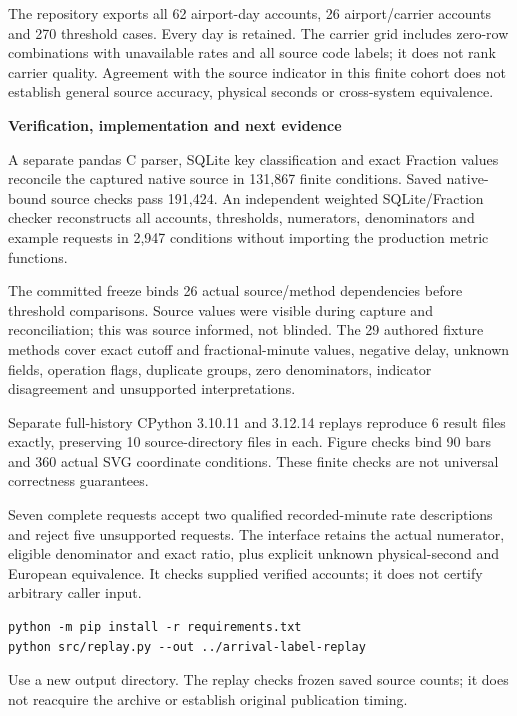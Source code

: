 \documentclass[11pt,letterpaper]{article}
\newcommand{\heading}[1]{\vspace{4pt}{\large\bfseries #1}\par}
\newcommand{\BoundAX}{62}
\newcommand{\BoundAY}{26}
\newcommand{\BoundAZ}{270}
\newcommand{\BoundBA}{131,867}
\newcommand{\BoundBB}{191,424}
\newcommand{\BoundBC}{2,947}
\newcommand{\BoundBD}{26}
\newcommand{\BoundBE}{29}
\newcommand{\BoundBF}{3.10.11}
\newcommand{\BoundBG}{3.12.14}
\newcommand{\BoundBH}{6}
\newcommand{\BoundBI}{10}
\newcommand{\BoundBJ}{90}
\newcommand{\BoundBK}{360}
\begin{document}
\heading{Complete case retention}
The repository exports all \BoundAX{} airport-day accounts, \BoundAY{} airport/carrier accounts and \BoundAZ{} threshold cases. Every day is retained. The carrier grid includes zero-row combinations with unavailable rates and all source code labels; it does not rank carrier quality. Agreement with the source indicator in this finite cohort does not establish general source accuracy, physical seconds or cross-system equivalence.
\newpage
{\Large\bfseries Verification, implementation and next evidence\par}

\heading{Independent evidence}
A separate pandas C parser, SQLite key classification and exact Fraction values reconcile the captured native source in \BoundBA{} finite conditions. Saved native-bound source checks pass \BoundBB{}. An independent weighted SQLite/Fraction checker reconstructs all accounts, thresholds, numerators, denominators and example requests in \BoundBC{} conditions without importing the production metric functions.

The committed freeze binds \BoundBD{} actual source/method dependencies before threshold comparisons. Source values were visible during capture and reconciliation; this was source informed, not blinded. The \BoundBE{} authored fixture methods cover exact cutoff and fractional-minute values, negative delay, unknown fields, operation flags, duplicate groups, zero denominators, indicator disagreement and unsupported interpretations.

Separate full-history CPython \BoundBF{} and \BoundBG{} replays reproduce \BoundBH{} result files exactly, preserving \BoundBI{} source-directory files in each. Figure checks bind \BoundBJ{} bars and \BoundBK{} actual SVG coordinate conditions. These finite checks are not universal correctness guarantees.

\heading{Runnable implementation exercise}
Seven complete requests accept two qualified recorded-minute rate descriptions and reject five unsupported requests. The interface retains the actual numerator, eligible denominator and exact ratio, plus explicit unknown physical-second and European equivalence. It checks supplied verified accounts; it does not certify arbitrary caller input.

\begin{verbatim}
python -m pip install -r requirements.txt
python src/replay.py --out ../arrival-label-replay
\end{verbatim}
Use a new output directory. The replay checks frozen saved source counts; it does not reacquire the archive or establish original publication timing.
\end{document}
